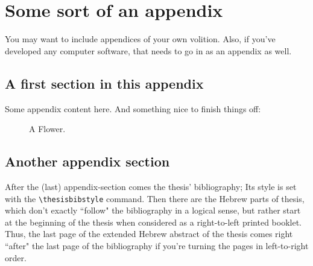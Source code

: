 \chapter{Some sort of an appendix}
\label{appendix:somesort}

You may want to include appendices of your own volition. Also, if you've developed any computer software, that needs to go in as an appendix as well.

\section{A first section in this appendix}

Some appendix content here. And something nice to finish things off:

\begin{figure}[htb]
  \centering
  \ifpdf
  \else
  \fi
  \caption{A Flower.}
\end{figure}

\section{Another appendix section}
After the (last) appendix-section comes the thesis' bibliography; Its style is set with the \verb|\thesisbibstyle| command. Then there are the Hebrew parts of thesis, which don't exactly ``follow" the bibliography in a logical sense, but rather start at the beginning of the thesis when considered as a right-to-left printed booklet. Thus, the last page of the extended Hebrew abstract of the thesis comes right ``after" the last page of the bibliography if you're turning the pages in left-to-right order.
